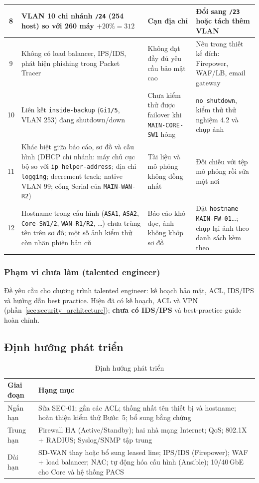 \begin{small}
\begin{longtable}{|c|p{4.3cm}|p{3.4cm}|p{5.0cm}|}
8 & VLAN 10 chi nhánh \texttt{/24} (254 host) so với 260 máy $+20\% = 312$ & Cạn địa chỉ & Đổi sang \texttt{/23} hoặc tách thêm VLAN \\ \hline
9 & Không có load balancer, IPS/IDS, phát hiện phishing trong Packet Tracer & Không đạt đầy đủ yêu cầu bảo mật cao & Nêu trong thiết kế đích: Firepower, WAF/LB, email gateway \\ \hline
10 & Liên kết \texttt{inside-backup} (\texttt{Gi1/5}, VLAN 253) đang shutdown/down & Chưa kiểm thử được failover khi \texttt{MAIN-CORE-SW1} hỏng & \texttt{no shutdown}, kiểm thử thử nghiệm 4.2 và chụp ảnh \\ \hline
11 & Khác biệt giữa báo cáo, sơ đồ và cấu hình (DHCP chi nhánh: máy chủ cục bộ so với \texttt{ip helper-address}; địa chỉ \texttt{logging}; decrement track; native VLAN 99; cổng Serial của \texttt{MAIN-WAN-R2}) & Tài liệu và mô phỏng không đồng nhất & Đối chiếu với tệp mô phỏng rồi sửa một nơi \\ \hline
12 & Hostname trong cấu hình (\texttt{ASA1}, \texttt{ASA2}, \texttt{Core-SW1/2}, \texttt{WAN-R1/R2}, \dots) chưa trùng tên trên sơ đồ; một số ảnh kiểm thử còn nhãn phiên bản cũ & Báo cáo khó đọc, ảnh không khớp sơ đồ & Đặt \texttt{hostname MAIN-FW-01}\dots; chụp lại ảnh theo danh sách kèm theo \\ \hline
\end{longtable}
\end{small}

\subsubsection{Phạm vi chưa làm (talented engineer)}
Đề yêu cầu cho chương trình talented engineer: kế hoạch bảo mật, ACL, IDS/IPS và hướng dẫn best practice. Hiện đã có kế hoạch, ACL và VPN (phần~\ref{sec:security_architecture}); \textbf{chưa có IDS/IPS} và best-practice guide hoàn chỉnh.

\subsection{Định hướng phát triển}
\begin{small}
\setlength{\tabcolsep}{4pt}
\begin{longtable}{|p{2.2cm}|p{11.6cm}|}
\caption{Định hướng phát triển} \label{tab:roadmap} \\
\hline
\textbf{Giai đoạn} & \textbf{Hạng mục} \\ \hline
\endhead
Ngắn hạn & Sửa SEC-01; gắn các ACL; thống nhất tên thiết bị và hostname; hoàn thiện kiểm thử Bước~5; bổ sung bằng chứng \\ \hline
Trung hạn & Firewall HA (Active/Standby); hai nhà mạng Internet; QoS; 802.1X + RADIUS; Syslog/SNMP tập trung \\ \hline
Dài hạn & SD-WAN thay hoặc bổ sung leased line; IPS/IDS (Firepower); WAF + load balancer; NAC; tự động hóa cấu hình (Ansible); 10/40\,GbE cho Core và hệ thống PACS \\ \hline
\end{longtable}
\end{small}


